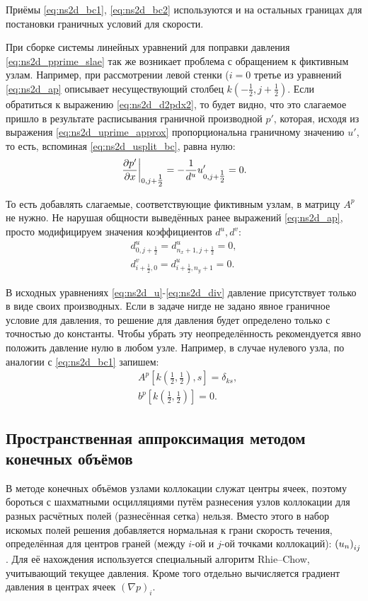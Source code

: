 Приёмы \eqref{eq:ns2d_bc1}, \eqref{eq:ns2d_bc2}
используются и на остальных границах для
постановки граничных условий для скорости.

При сборке системы линейных уравнений для
поправки давления \eqref{eq:ns2d_pprime_slae}
так же возникает проблема с обращением
к фиктивным узлам. Например, при рассмотрении левой стенки ($i=0$
третье из уравнений \eqref{eq:ns2d_ap} описывает
несуществующий столбец $k(-\tfrac12, j+\tfrac12)$.
Если обратиться к выражению \eqref{eq:ns2d_d2pdx2},
то будет видно, что это слагаемое пришло в результате
расписывания граничной производной $p'$,
которая, исходя из выражения \eqref{eq:ns2d_uprime_approx} пропорциональна граничному значению $u'$,
то есть, вспоминая \eqref{eq:ns2d_usplit_bc}, равна нулю:
\begin{equation*}
\left. \frac{\partial p'}{\partial x} \right|_{0,j+\tfrac12} = -\frac{1}{d^u} u'_{0,j+\tfrac12} = 0.
\end{equation*}

То есть добавлять слагаемые, соответствующие фиктивным узлам, в матрицу $A^p$ не нужно.
Не нарушая общности выведённых ранее выражений \eqref{eq:ns2d_ap},
просто модифицируем значения коэффициентов $d^u, d^v$:
\begin{align}
    \label{eq:ns2d_bc3}
    d^u_{0, j+\tfrac12} = d^u_{n_x+1, j+\tfrac12} = 0, \\[10pt]
    \nonumber
    d^v_{i+\tfrac12, 0} = d^u_{i+\tfrac12, n_y+1} = 0.
\end{align}

В исходных уравнениях
\eqref{eq:ns2d_u}-\eqref{eq:ns2d_div}
давление присутствует только в виде своих производных.
Если в задаче нигде не задано явное граничное условие
для давления, то решение для давления
будет определено только с точностью до константы.
Чтобы убрать эту неопределённость
рекомендуется явно положить давление нулю
в любом узле. Например, в случае нулевого узла,
по аналогии с \eqref{eq:ns2d_bc1} запишем:
\begin{align}
    \label{eq:ns2d_bc4}
    &A^p[k(\tfrac12, \tfrac12), s] = \delta_{ks}, \\[10pt]
    \nonumber
    &b^{p}[k(\tfrac12, \tfrac12)] = 0.
\end{align}

\subsection{Пространственная аппроксимация методом конечных объёмов}
\label{sec:simple_scheme_fem}
В методе конечных объёмов узлами коллокации служат
центры ячеек, поэтому бороться с шахматными осцилляциями
путём разнесения узлов коллокации для разных
расчётных полей (разнесённая сетка) нельзя.
Вместо этого в набор искомых полей решения добавляется
нормальная к грани скорость течения, определённая для центров граней (между $i$-ой и $j$-ой точками коллокаций): $\left(u_n\right)_{ij}$.
Для её нахождения используется специальный алгоритм Rhie--Chow, учитывающий текущее давления.
Кроме того отдельно вычисляется градиент давления в центрах ячеек $(\nabla p)_i$.

